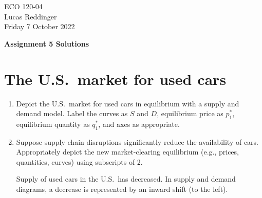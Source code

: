 \documentclass[
    letterpaper,paper=portrait,fleqn,
    DIV=16,fontsize=12pt,twoside=semi,
    parskip=full-,
    headings=standardclasses]
{scrartcl}
\begin{document}
\RaggedRight
\thispagestyle{plain}

ECO 120-04 \\
Lucas Reddinger \\
Friday 7 October 2022

\vspace{0.7\baselineskip}
\textbf{\LARGE Assignment 5 Solutions}

\section{The U.S.~market for used cars}

\begin{enumerate}

\item Depict the U.S.~market for used cars in equilibrium with a supply and demand model. Label the curves as $S$ and $D$, equilibrium price as $p^*_1$, equilibrium quantity as $q^*_1$, and axes as appropriate.

\begin{solution}
\begin{center}
\end{center}
\vspace{-12pt}
\end{solution}

\item Suppose supply chain disruptions significantly reduce the availability of cars. Appropriately depict the new market-clearing equilibrium (e.g., prices, quantities, curves) using subscripts of 2.

\begin{solution}
Supply of used cars in the U.S.~has decreased. In supply and demand diagrams, a decrease is represented by an inward shift (to the left).

\begin{center}
\end{center}
\vspace{-12pt}
\end{solution}


\end{enumerate}
\end{document}
